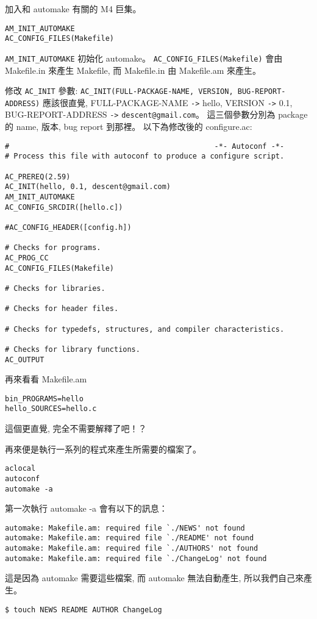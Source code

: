 \documentclass[12pt,a4]{article}
\begin{document}
\begin{CJK}{UTF8}{bsmi}
加入和 automake 有關的 M4 巨集。
\begin{verbatim}
AM_INIT_AUTOMAKE
AC_CONFIG_FILES(Makefile)
\end{verbatim}

\verb+AM_INIT_AUTOMAKE+ 初始化 automake。
\verb+AC_CONFIG_FILES(Makefile)+ 會由 Makefile.in 來產生 Makefile,
而 Makefile.in 由 Makefile.am 來產生。


修改 \verb+AC_INIT+ 參數:
\verb+AC_INIT(FULL-PACKAGE-NAME, VERSION, BUG-REPORT-ADDRESS)+
應該很直覺, FULL-PACKAGE-NAME \verb+->+ hello,
VERSION \verb+->+ 0.1,
BUG-REPORT-ADDRESS \verb+->+ \verb+descent@gmail.com+。
這三個參數分別為 package 的 name, 版本, bug report 到那裡。
以下為修改後的 configure.ac:

\begin{lstlisting}[frame=single,frameround=tttt,breaklines=true]
#                                               -*- Autoconf -*-
# Process this file with autoconf to produce a configure script.

AC_PREREQ(2.59)
AC_INIT(hello, 0.1, descent@gmail.com)
AM_INIT_AUTOMAKE
AC_CONFIG_SRCDIR([hello.c])

#AC_CONFIG_HEADER([config.h])

# Checks for programs.
AC_PROG_CC
AC_CONFIG_FILES(Makefile)

# Checks for libraries.

# Checks for header files.

# Checks for typedefs, structures, and compiler characteristics.

# Checks for library functions.
AC_OUTPUT
\end{lstlisting}

再來看看 Makefile.am

\begin{verbatim}
bin_PROGRAMS=hello
hello_SOURCES=hello.c
\end{verbatim}

這個更直覺, 完全不需要解釋了吧！？

再來便是執行一系列的程式來產生所需要的檔案了。

\begin{verbatim}
aclocal
autoconf
automake -a
\end{verbatim}

第一次執行 automake -a 會有以下的訊息：
\begin{lstlisting}[frame=single,frameround=tttt,breaklines=true]
automake: Makefile.am: required file `./NEWS' not found
automake: Makefile.am: required file `./README' not found
automake: Makefile.am: required file `./AUTHORS' not found
automake: Makefile.am: required file `./ChangeLog' not found
\end{lstlisting}
這是因為 automake 需要這些檔案, 而 automake 無法自動產生,
所以我們自己來產生。
\begin{verbatim}
$ touch NEWS README AUTHOR ChangeLog
\end{verbatim}


\end{CJK}
\end{document}
